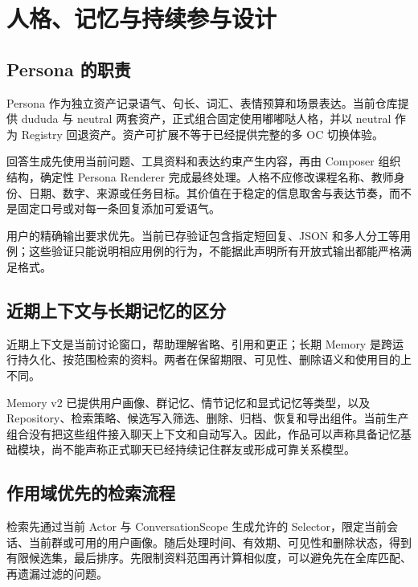 \section{人格、记忆与持续参与设计}
\subsection{Persona 的职责}
Persona 作为独立资产记录语气、句长、词汇、表情预算和场景表达。当前仓库提供 dududa 与 neutral 两套资产，正式组合固定使用嘟嘟哒人格，并以 neutral 作为 Registry 回退资产。资产可扩展不等于已经提供完整的多 OC 切换体验。

回答生成先使用当前问题、工具资料和表达约束产生内容，再由 Composer 组织结构，确定性 Persona Renderer 完成最终处理。人格不应修改课程名称、教师身份、日期、数字、来源或任务目标。其价值在于稳定的信息取舍与表达节奏，而不是固定口号或对每一条回复添加可爱语气。

用户的精确输出要求优先。当前已存验证包含指定短回复、JSON 和多人分工等用例；这些验证只能说明相应用例的行为，不能据此声明所有开放式输出都能严格满足格式。

\subsection{近期上下文与长期记忆的区分}
近期上下文是当前讨论窗口，帮助理解省略、引用和更正；长期 Memory 是跨运行持久化、按范围检索的资料。两者在保留期限、可见性、删除语义和使用目的上不同。

Memory v2 已提供用户画像、群记忆、情节记忆和显式记忆等类型，以及 Repository、检索策略、候选写入筛选、删除、归档、恢复和导出组件。当前生产组合没有把这些组件接入聊天上下文和自动写入。因此，作品可以声称具备记忆基础模块，尚不能声称正式聊天已经持续记住群友或形成可靠关系模型。

\subsection{作用域优先的检索流程}
检索先通过当前 Actor 与 ConversationScope 生成允许的 Selector，限定当前会话、当前群或可用的用户画像。随后处理时间、有效期、可见性和删除状态，得到有限候选集，最后排序。先限制资料范围再计算相似度，可以避免先在全库匹配、再遗漏过滤的问题。

\begin{center}
\end{center}

